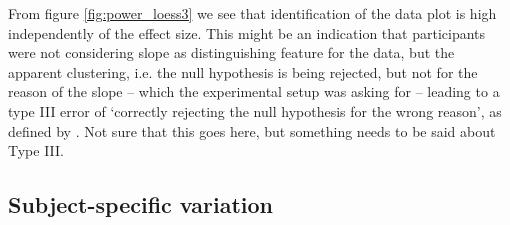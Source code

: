 \documentclass{article}
\newcommand{\green}[1]{{\color{green} #1}} %
\newcommand{\hh}[1]{{\color{orange} #1}} %
\begin{document}



\hh{From figure \ref{fig:power_loess3} we see that identification of the data plot is high independently of the effect size. This might be an indication that participants were not considering slope as distinguishing feature for the data, but the apparent clustering, i.e. the null hypothesis is being rejected, but not for the reason of the slope -- which the experimental setup was asking for --  leading to a type III error of `correctly rejecting the null hypothesis for the wrong reason', as defined by \citet{mosteller:48}.} \green{Not sure that this goes here, but something needs to be said about Type III.}

\subsection{Subject-specific variation}
\end{document}
